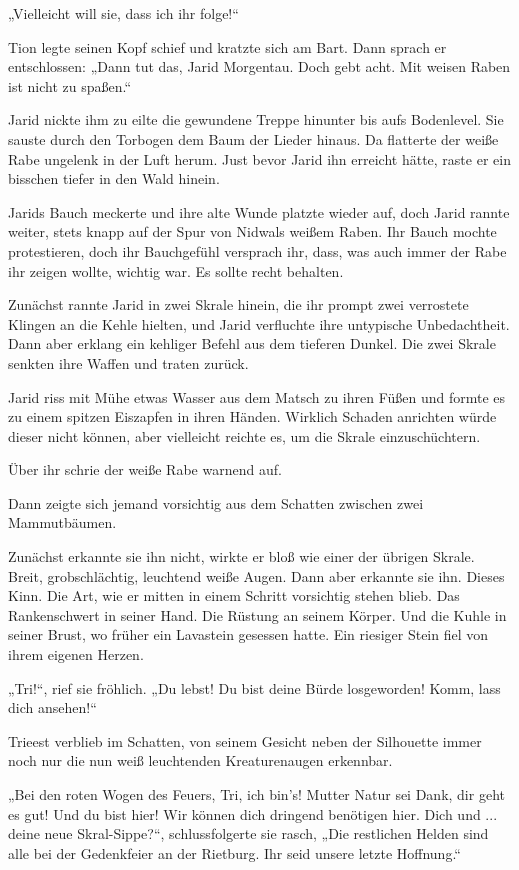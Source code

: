 „Vielleicht will sie, dass ich ihr folge!“

Tion legte seinen Kopf schief und kratzte sich am Bart. Dann sprach er entschlossen: „Dann tut das, Jarid Morgentau. Doch gebt acht. Mit weisen Raben ist nicht zu spaßen.“

Jarid nickte ihm zu eilte die gewundene Treppe hinunter bis aufs Bodenlevel. Sie sauste durch den Torbogen dem Baum der Lieder hinaus. Da flatterte der weiße Rabe ungelenk in der Luft herum. Just bevor Jarid ihn erreicht hätte, raste er ein bisschen tiefer in den Wald hinein.

Jarids Bauch meckerte und ihre alte Wunde platzte wieder auf, doch Jarid rannte weiter, stets knapp auf der Spur von Nidwals weißem Raben. Ihr Bauch mochte protestieren, doch ihr Bauchgefühl versprach ihr, dass, was auch immer der Rabe ihr zeigen wollte, wichtig war. Es sollte recht behalten.

Zunächst rannte Jarid in zwei Skrale hinein, die ihr prompt zwei verrostete Klingen an die Kehle hielten, und Jarid verfluchte ihre untypische Unbedachtheit. Dann aber erklang ein kehliger Befehl aus dem tieferen Dunkel. Die zwei Skrale senkten ihre Waffen und traten zurück.

Jarid riss mit Mühe etwas Wasser aus dem Matsch zu ihren Füßen und formte es zu einem spitzen Eiszapfen in ihren Händen. Wirklich Schaden anrichten würde dieser nicht können, aber vielleicht reichte es, um die Skrale einzuschüchtern.

Über ihr schrie der weiße Rabe warnend auf.

Dann zeigte sich jemand vorsichtig aus dem Schatten zwischen zwei Mammutbäumen.

Zunächst erkannte sie ihn nicht, wirkte er bloß wie einer der übrigen Skrale. Breit, grobschlächtig, leuchtend weiße Augen. Dann aber erkannte sie ihn. Dieses Kinn. Die Art, wie er mitten in einem Schritt vorsichtig stehen blieb. Das Rankenschwert in seiner Hand. Die Rüstung an seinem Körper. Und die Kuhle in seiner Brust, wo früher ein Lavastein gesessen hatte. Ein riesiger Stein fiel von ihrem eigenen Herzen.

„Tri!“, rief sie fröhlich. „Du lebst! Du bist deine Bürde losgeworden! Komm, lass dich ansehen!“

Trieest verblieb im Schatten, von seinem Gesicht neben der Silhouette immer noch nur die nun weiß leuchtenden Kreaturenaugen erkennbar.

„Bei den roten Wogen des Feuers, Tri, ich bin’s! Mutter Natur sei Dank, dir geht es gut! Und du bist hier! Wir können dich dringend benötigen hier. Dich und ... deine neue Skral-Sippe?“, schlussfolgerte sie rasch, „Die restlichen Helden sind alle bei der Gedenkfeier an der Rietburg. Ihr seid unsere letzte Hoffnung.“

